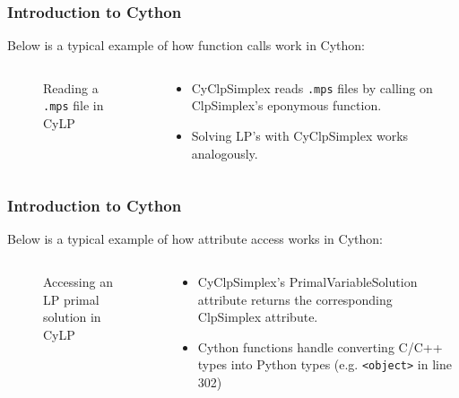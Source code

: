 \documentclass{beamer}
\begin{document}
	\begin{frame}[t]
		\frametitle{Introduction to Cython}
		\small
		Below is a typical example of how function calls work in Cython:
		\begin{columns}[T]
			\begin{column}{0.65\textwidth}
				\begin{figure}[h]
					\caption{Reading a \texttt{.mps} file in CyLP}
					\label{p:cyclp_readmps}
				\end{figure}
			\end{column}
			\begin{column}{0.35\textwidth}
				\begin{itemize}
					\item CyClpSimplex reads \texttt{.mps} files by calling on ClpSimplex's eponymous function.
					\item Solving LP's with CyClpSimplex works analogously. 
				\end{itemize}
			\end{column}
		\end{columns}
		\normalsize
	\end{frame}

	\begin{frame}[t]
		\frametitle{Introduction to Cython}
		\small
		Below is a typical example of how attribute access works in Cython:
		\begin{columns}[T]
			\begin{column}{0.65\textwidth}
				\begin{figure}[h]
					\caption{Accessing an LP primal solution in CyLP}
					\label{p:cyclp_solution}
				\end{figure}
			\end{column}
			\begin{column}{0.35\textwidth}
				\begin{itemize}
					\item CyClpSimplex's PrimalVariableSolution attribute returns the corresponding ClpSimplex attribute.
					\item Cython functions handle converting C/C++ types into Python types (e.g. \texttt{<object>} in line 302)
				\end{itemize}
			\end{column}
		\end{columns}
		\normalsize
	\end{frame}
	
\end{document}
